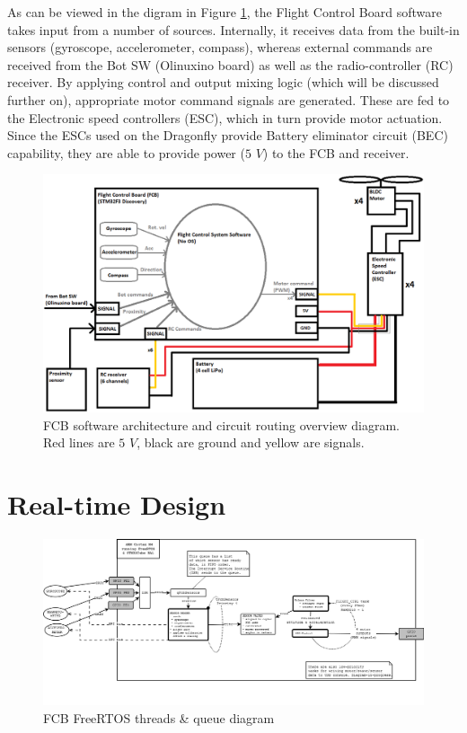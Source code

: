 \documentclass[a4paper]{report}
\begin{document}
As can be viewed in the digram in Figure \ref{fig:fcb-sw-hw-arch}, the Flight Control Board software takes input from a number of sources. Internally, it receives data from the built-in sensors (gyroscope, accelerometer, compass), whereas external commands are received from the Bot SW (Olinuxino board) as well as the radio-controller (RC) receiver. By applying control and output mixing logic (which will be discussed further on), appropriate motor command signals are generated. These are fed to the Electronic speed controllers (ESC), which in turn provide motor actuation. Since the ESCs used on the Dragonfly provide Battery eliminator circuit (BEC) capability, they are able to provide power ($5$ $V$) to the FCB and receiver.

\begin{figure}[h]
    \centering
    \includegraphics[scale=0.42]{images/fcb-sw-hw-design.png}
    \caption{FCB software architecture and circuit routing overview diagram. Red lines are $5$ $V$, black are ground and yellow are signals.}
    \label{fig:fcb-sw-hw-arch}
\end{figure}

	\section{Real-time Design}
\begin{figure}[h]
    \centering
    \includegraphics[width=\textwidth]{images/FcbThreadsOverview.png}
    \caption{FCB FreeRTOS threads \& queue diagram}
    \label{fig:freertos-threads-queues-diag}
\end{figure}
\end{document}
